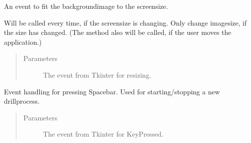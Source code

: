 \documentclass[letterpaper,10pt,english]{sphinxmanual}
\begin{document}
\begin{fulllineitems}
\begin{fulllineitems}
\end{fulllineitems}


\begin{fulllineitems}
\label{\detokenize{anoog.automation:anoog.automation.graphical_user_interface.GUI_App.event_resize_bg}}
\sphinxAtStartPar
An event to fit the background\sphinxhyphen{}image to the screen\sphinxhyphen{}size.

\sphinxAtStartPar
Will be called every time, if the screen\sphinxhyphen{}size is changing. Only change image\sphinxhyphen{}size, if the size has changed.
(The method also will be called, if the user moves the application.)
\begin{quote}\begin{description}
\item[{Parameters}] \leavevmode
\sphinxAtStartPar
{} \textendash{} The event from Tkinter for resizing.

\end{description}\end{quote}

\end{fulllineitems}


\begin{fulllineitems}
\label{\detokenize{anoog.automation:anoog.automation.graphical_user_interface.GUI_App.event_space}}
\sphinxAtStartPar
Event handling for pressing Spacebar.
Used for starting/stopping a new drill\sphinxhyphen{}process.
\begin{quote}\begin{description}
\item[{Parameters}] \leavevmode
\sphinxAtStartPar
{} \textendash{} The event from Tkinter for Key\sphinxhyphen{}Pressed.

\end{description}\end{quote}


\end{fulllineitems}
\end{fulllineitems}
\end{document}
